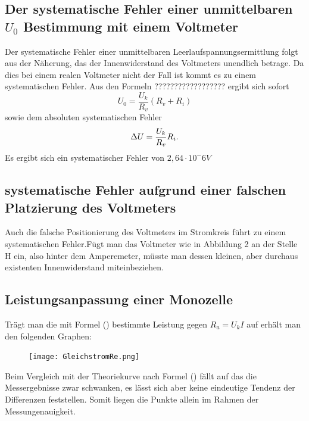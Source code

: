 \subsection{Der systematische Fehler einer unmittelbaren $U_0$ Bestimmung mit einem Voltmeter}
Der systematische Fehler einer unmittelbaren Leerlaufspannungsermittlung folgt aus der Näherung, das
der Innenwiderstand des Voltmeters unendlich betrage. Da dies bei einem realen Voltmeter nicht der
Fall ist kommt es zu einem systematischen Fehler.
Aus den Formeln ?????????????????? ergibt sich sofort
\begin{equation}
U_0 = \frac{U_k}{R_v}(R_v + R_i)
\end{equation}
sowie dem absoluten systematischen Fehler
\begin{equation}
\Delta U = \frac{U_k}{R_v}R_i \text.
\end{equation}
Es ergibt sich ein systematischer Fehler von $2,64 \cdot 10^-6 V$





\subsection{systematische Fehler aufgrund einer falschen Platzierung des Voltmeters}
Auch die falsche Positionierung des Voltmeters im Stromkreis führt zu einem
systematischen Fehler.Fügt man das Voltmeter wie in Abbildung 2 an der Stelle H
ein, also hinter dem Amperemeter, müsste man dessen kleinen, aber durchaus existenten
Innenwiderstand miteinbeziehen.

\newpage
\subsection{Leistungsanpassung einer Monozelle}
Trägt man die mit Formel () bestimmte Leistung gegen $R_a = U_k I$ auf erhält man
den folgenden Graphen:
\begin{figure}[H]
	\centering
	\caption{}
	\texttt{[image: GleichstromRe.png]}
	\label{fig:GleichstromLeistung}
\end{figure}
Beim Vergleich mit der Theoriekurve nach Formel () fällt auf das die Messergebnisse
zwar schwanken, es lässt sich aber keine eindeutige Tendenz der Differenzen feststellen.
Somit liegen die Punkte allein im Rahmen der Messungenauigkeit.
